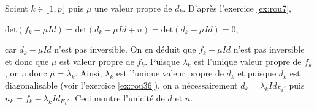 {{Soient $k\in\llbracket1,p\rrbracket$ puis $\mu$ une valeur propre de $d_k$. D'après l'exercice \ref{ex:rou7},

\begin{center}
$\text{det}(f_k-\mu Id)=\text{det}(d_k-\mu Id+n)=\text{det}(d_k-\mu Id)=0$,
\end{center}

car $d_k-\mu Id$ n'est pas inversible. On en déduit que $f_k-\mu Id$ n'est pas inversible et donc que $\mu$ est valeur propre de $f_k$. Puisque $\lambda_k$ est l'unique valeur propre de $f_k$, on a donc $\mu=\lambda_k$. Ainsi, $\lambda_k$ est l'unique valeur propre de $d_k$ et puisque $d_k$ est diagonalisable (voir l'exercice \ref{ex:rou36}), on a nécessairement $d_k=\lambda_kId_{E_k'}$ puis $n_k=f_k-\lambda_k Id_{E_k'}$. Ceci montre l'unicité de $d$ et $n$.}
}
